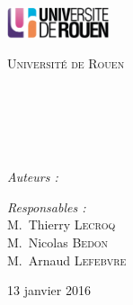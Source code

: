 
\begin{titlepage}

\begin{center}

\begin{flushleft}
  \includegraphics [width=30mm]{images/logo-univ.jpg} \\[0.5cm]
  \begin{spacing}{1.5}
    \textsc{\LARGE Université de Rouen}\\[1.5cm]
  \end{spacing}
\end{flushleft}

\textsc{\Large \reportsubject}\\[0.5cm]
\HRule \\[0.4cm]
{\huge \bfseries \reporttitle}\\[0.4cm]
\HRule \\[1.5cm]

\begin{minipage}[t]{0.3\textwidth}
  \begin{flushleft} \large
    \emph{Auteurs :}\\
    \reportauthor
  \end{flushleft}
\end{minipage}
\begin{minipage}[t]{0.6\textwidth}
  \begin{flushright} \large
    \emph{Responsables :} \\
    M.~Thierry \textsc{Lecroq} \\
    M.~Nicolas \textsc{Bedon} \\
    M.~Arnaud \textsc{Lefebvre}
  \end{flushright}
\end{minipage}

\vfill

{\large 13 janvier 2016}

\end{center}

\end{titlepage}
